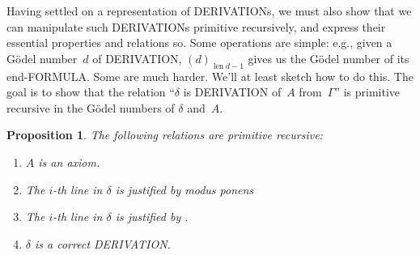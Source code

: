 \documentclass[10pt,a4paper]{article}
\newcommand*{\olup}[1]{\MakeUppercase{#1}}
\theoremstyle{plain}
\newtheorem{prop}[thm]{Proposition}
\theoremstyle{definition}
\theoremstyle{remark}
\newenvironment{explain}{}{}
\newcommand*{\ollabel}[1]{\label{#1}}
\providecommand{\len}{\operatorname{len}}
\providecommand{\QR}{\mathrm{QR}}
\begin{document}
\begin{explain}
Having settled on a representation of \olup{derivation}s, we must also
show that we can manipulate such \olup{derivation}s primitive recursively, and
express their essential properties and relations so.  Some operations
are simple: e.g., given a G\"odel number~$d$ of \olup{derivation},
$(d)_{\len{d}-1}$ gives us the G\"odel number of its end-\olup{formula}.  Some are
much harder.  We'll at least sketch how to do this.  The goal is to
show that the relation ``$\delta$ is \olup{derivation} of~$A$
from~$\Gamma$'' is primitive recursive in the G\"odel numbers of
$\delta$ and~$A$.
\end{explain}

\begin{prop}
\ollabel{prop:followsby}
The following relations are primitive recursive:
\begin{enumerate}
\item $A$ is an axiom.
\item The $i$-th line in $\delta$ is justified by modus ponens
\item The $i$-th line in $\delta$ is justified by \QR.
\item $\delta$ is a correct \olup{derivation}.
\end{enumerate}
\end{prop}
\end{document}
